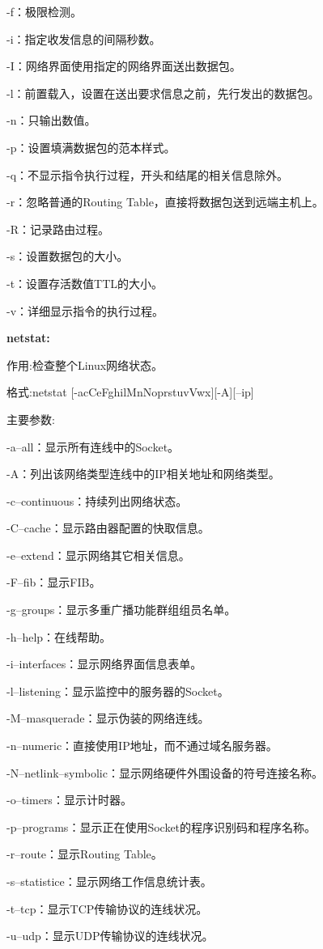 -f：极限检测。

-i：指定收发信息的间隔秒数。

-I：网络界面使用指定的网络界面送出数据包。

-l：前置载入，设置在送出要求信息之前，先行发出的数据包。

-n：只输出数值。

-p：设置填满数据包的范本样式。

-q：不显示指令执行过程，开头和结尾的相关信息除外。

-r：忽略普通的Routing Table，直接将数据包送到远端主机上。

-R：记录路由过程。

-s：设置数据包的大小。

-t：设置存活数值TTL的大小。

-v：详细显示指令的执行过程。

\textbf{netstat:}

作用:检查整个Linux网络状态。

格式:netstat [-acCeFghilMnNoprstuvVwx][-A][--ip]

主要参数:

-a--all：显示所有连线中的Socket。

-A：列出该网络类型连线中的IP相关地址和网络类型。

-c--continuous：持续列出网络状态。

-C--cache：显示路由器配置的快取信息。

-e--extend：显示网络其它相关信息。

-F--fib：显示FIB。

-g--groups：显示多重广播功能群组组员名单。

-h--help：在线帮助。

-i--interfaces：显示网络界面信息表单。

-l--listening：显示监控中的服务器的Socket。

-M--masquerade：显示伪装的网络连线。

-n--numeric：直接使用IP地址，而不通过域名服务器。

-N--netlink--symbolic：显示网络硬件外围设备的符号连接名称。

-o--timers：显示计时器。

-p--programs：显示正在使用Socket的程序识别码和程序名称。

-r--route：显示Routing Table。

-s--statistice：显示网络工作信息统计表。

-t--tcp：显示TCP传输协议的连线状况。

-u--udp：显示UDP传输协议的连线状况。

